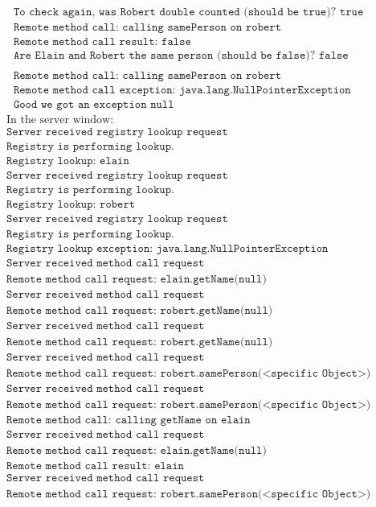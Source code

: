 \documentclass[12pt]{article}
\begin{document}
\begin{align*}
	&\texttt{To check again, was Robert double counted (should be true)? true} \\
	&\texttt{Remote method call: calling samePerson on robert} \\
	&\texttt{Remote method call result: false} \\
	&\texttt{Are Elain and Robert the same person (should be false)? false} \\ \\
	&\texttt{Remote method call: calling samePerson on robert} \\
	&\texttt{Remote method call exception: java.lang.NullPointerException} \\
	&\texttt{Good we got an exception null}
\end{align*}
\begin{align*}
	&\text{In the server window:} \\
	&\texttt{Server received registry lookup request} \\
	&\texttt{Registry is performing lookup.} \\
	&\texttt{Registry lookup: elain} \\
	&\texttt{Server received registry lookup request} \\
	&\texttt{Registry is performing lookup.} \\
	&\texttt{Registry lookup: robert} \\
	&\texttt{Server received registry lookup request} \\
	&\texttt{Registry is performing lookup.} \\
	&\texttt{Registry lookup exception: java.lang.NullPointerException} \\
	&\texttt{Server received method call request} \\
	&\texttt{Remote method call request: elain.getName(null)} \\
	&\texttt{Server received method call request} \\
	&\texttt{Remote method call request: robert.getName(null)} \\
	&\texttt{Server received method call request} \\
	&\texttt{Remote method call request: robert.getName(null)} \\
	&\texttt{Server received method call request} \\
	&\texttt{Remote method call request: robert.samePerson(<specific Object>)} \\
	&\texttt{Server received method call request} \\
	&\texttt{Remote method call request: robert.samePerson(<specific Object>)} \\
	&\texttt{Remote method call: calling getName on elain} \\
	&\texttt{Server received method call request} \\
	&\texttt{Remote method call request: elain.getName(null)} \\
	&\texttt{Remote method call result: elain} \\
	&\texttt{Server received method call request} \\
	&\texttt{Remote method call request: robert.samePerson(<specific Object>)}
\end{align*}
\end{document}

